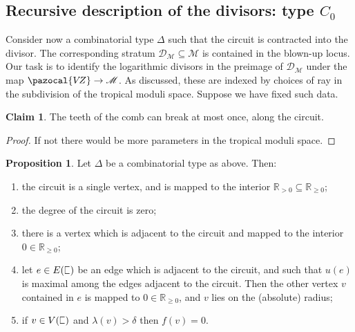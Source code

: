 \documentclass[11pt]{amsart}
\newcommand{\sqC}{\scalebox{0.8}[1.3]{$\sqsubset$}}
\newcommand{\VZ}{\pazocal{V\!Z}}
\renewcommand{\to}{\rightarrow}
\newcommand{\Mcal}{\mathcal{M}}
\newcommand{\Dcal}{\mathcal{D}}
\newcommand{\RR}{\mathbb{R}}
\theoremstyle{definition}
\newtheorem{prop}[thm]{Proposition}
\newtheorem{claim}{Claim}
\theoremstyle{definition}
\begin{document}
\subsection{Recursive description of the divisors: type $C_0$} Consider now a combinatorial type $\Delta$ such that the circuit is contracted into the divisor. The corresponding stratum $\Dcal_\Mcal \subseteq \Mcal$ is contained in the blown-up locus. Our task is to identify the logarithmic divisors in the preimage of $\Dcal_\Mcal$ under the map $\VZ \to \Mcal$. As discussed, these are indexed by choices of ray in the subdivision of the tropical moduli space. Suppose we have fixed such data.

\begin{claim} The teeth of the comb can break at most once, along the circuit.\end{claim}

\begin{proof} If not there would be more parameters in the tropical moduli space. \end{proof}

\begin{prop} Let $\Delta$ be a combinatorial type as above. Then:
\begin{enumerate}
\item the circuit is a single vertex, and is mapped to the interior $\RR_{>0} \subseteq \RR_{\geq 0}$;
\item the degree of the circuit is zero;
\item there is a vertex which is adjacent to the circuit and mapped to the interior $0 \in \RR_{\geq 0}$;
\item let $e \in E(\sqC)$ be an edge which is adjacent to the circuit, and such that $u(e)$ is maximal among the edges adjacent to the circuit. Then the other vertex $v$ contained in $e$ is mapped to $0 \in \RR_{\geq 0}$, and $v$ lies on the (absolute) radius;
\item if $v \in V(\sqC)$ and $\lambda(v) > \delta$ then $f(v)=0$.
\end{enumerate}
\end{prop}
\end{document}
